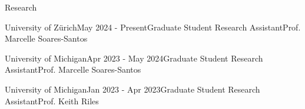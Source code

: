 \documentclass{resume} %
\begin{document}
\begin{rSection}{Research}


\begin{rSubsection}{University of Zürich}{May 2024 - Present}{Graduate Student Research Assistant}{Prof. Marcelle Soares-Santos}
\end{rSubsection}


\begin{rSubsection}{University of Michigan}{Apr 2023 - May 2024}{Graduate Student Research Assistant}{Prof. Marcelle Soares-Santos}
\end{rSubsection}

\begin{rSubsection}{University of Michigan}{Jan 2023 - Apr 2023}{Graduate Student Research Assistant}{Prof. Keith Riles}
\end{rSubsection}


\end{rSection}
\end{document}
